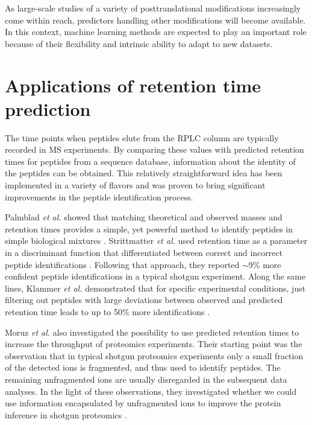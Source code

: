 \documentclass[a4paper]{article}
\begin{document}
As large-scale studies of a variety of posttranslational modifications
increasingly come within reach, predictors
handling other modifications will become available. In this context,
machine learning methods are expected to play an important role
because of their flexibility and intrinsic ability to adapt to new
datasets.


\section{\label{sec:app}Applications of retention time prediction}

The time points when peptides elute from the RPLC column are typically
recorded in MS experiments. By comparing these values with predicted
retention times for peptides from a sequence database, information
about the identity of the peptides can be obtained. This relatively
straightforward idea has been implemented in a variety of flavors and
was proven to bring significant improvements in the peptide
identification process.


Palmblad {\em et al.} showed that matching theoretical and observed
masses and retention times provides a simple, yet powerful method to
identify peptides in simple biological mixtures
\cite{palmblad2002prediction}. Strittmatter {\em et al.} used
retention time as a parameter in a discriminant function that
differentiated between correct and incorrect peptide identifications
\cite{Strittmatter2004}. Following that approach, they reported
$\sim$9\% more confident peptide identifications in a typical shotgun
experiment. Along the same lines, Klammer {\em et al.} demonstrated
that for specific experimental conditions, just filtering out peptides
with large deviations between observed and predicted retention time
leads to up to 50\% more identifications \cite{klammer2007improving}. 



Moruz {\em et al.} also investigated the possibility to use predicted
retention times to increase the throughput of proteomics
experiments. Their starting point was the observation that in typical
shotgun proteomics experiments only a small fraction of the detected
ions is fragmented, and thus used to identify peptides. The remaining
unfragmented ions are usually disregarded in the subsequent data
analyses. In the light of these observations, they investigated
whether we could use information encapsulated by unfragmented ions to
improve the protein inference in shotgun proteomics \cite{mf}.
\end{document}
